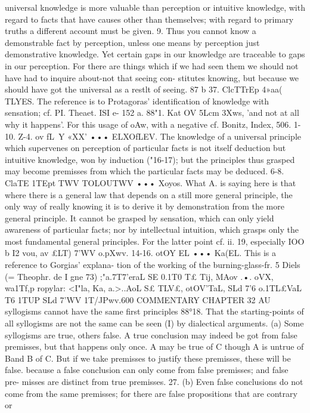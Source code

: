 {{{{{{{{{{{{{{{{{{{{{{{{{{{{{{{{{{{{{universal knowledge is more valuable than perception or intuitive
knowledge, with regard to facts that have causes other than
themselves; with regard to primary truths a different account
must be given.
9. Thus you cannot know a demonstrable fact by perception,
unless one means by perception just demonstrative knowledge.
Yet certain gaps in our knowledge are traceable to gaps in our
perception. For there are things which if we had seen them we
should not have had to inquire about-not that seeing con-
stitutes knowing, but because we should have got the universal
as a rest{lt of seeing.
87 b 37. ClcTTrEp 4»aa( TLYES. The reference is to Protagoras'
identification of knowledge with sensation; cf. PI. Theaet. ISI e-
152 a.
88"1. Kat OV 5Lcm 3Xws, 'and not at all why it happens'. For
this usage of oAw, with a negative cf. Bonitz, Index, 506. 1-10.
Z-4. ov fL~Y «XX' ••• ELXOfLEV. The knowledge of a universal
principle which supervenes on perception of particular facts is
not itself deduction but intuitive knowledge, won by induction
("16-17); but the principles thus grasped may become premisses
from which the particular facts may be deduced.
6-8. ClaTE 1TEpt TWV TOLOUTWV ••• Xoyos. What A. is saying
here is that where there is a general law that depends on a still
more general principle, the only way of really knowing it is to
derive it by demonstration from the more general principle. It
cannot be grasped by sensation, which can only yield awareness
of particular facts; nor by intellectual intuition, which grasps
only the most fundamental general principles. For the latter
point cf. ii. 19, especially IOO b I2 vou, av £LT) 7'WV o.pXwv.
14-16. otOY EL ••• Ka(EL. This is a reference to Gorgias' explana-
tion of the working of the burning-glass-fr. 5 Diels (= Theophr.
de I gne 73) ;"a.7T7'eraL SE 0.1T0 T£ Tij, MAov .•. oVX, wa1Tf,p ropylar:
<I"la, Ka,
a.>..AoL S£ TLV£,
otOV'TaL,
SLd 7'6 o.1TL£VaL T6 1TUP SLd 7'WV 1T/JPwv.600
COMMENTARY
CHAPTER 32
AU syllogisms cannot have the same first principles
88°18. That the starting-points of all syllogisms are not the
same can be seen (I) by dialectical arguments. (a) Some syllogisms
are true, others false. A true conclusion may indeed be got from
false premisses, but that happens only once. A may be true of
C though A is untrue of Band B of C. But if we take premisses
to justify these premisses, these will be false. because a false
conclusion can only come from false premisses; and false pre-
misses are distinct from true premisses.
27. (b) Even false conclusions do not come from the same
premisses; for there are false propositions that are contrary or
}}}}}}}}}}}}}}}}}}}}}}}}}}}}}}}}}}}}}}
